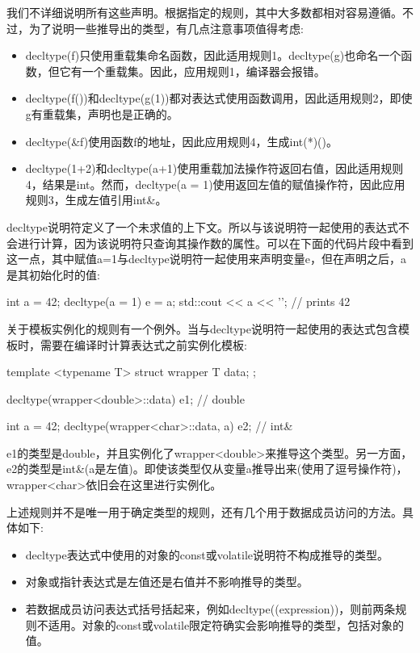 我们不详细说明所有这些声明。根据指定的规则，其中大多数都相对容易遵循。不过，为了说明一些推导出的类型，有几点注意事项值得考虑:

\begin{itemize}
\item
decltype(f)只使用重载集命名函数，因此适用规则1。decltype(g)也命名一个函数，但它有一个重载集。因此，应用规则1，编译器会报错。

\item
decltype(f())和decltype(g(1))都对表达式使用函数调用，因此适用规则2，即使g有重载集，声明也是正确的。

\item
decltype(\&f)使用函数f的地址，因此应用规则4，生成int(*)()。

\item
decltype(1+2)和decltype(a+1)使用重载加法操作符返回右值，因此适用规则4，结果是int。然而，decltype(a = 1)使用返回左值的赋值操作符，因此应用规则3，生成左值引用int\&。
\end{itemize}

decltype说明符定义了一个未求值的上下文。所以与该说明符一起使用的表达式不会进行计算，因为该说明符只查询其操作数的属性。可以在下面的代码片段中看到这一点，其中赋值a=1与decltype说明符一起使用来声明变量e，但在声明之后，a是其初始化时的值:

\begin{cpp}
int a = 42;
decltype(a = 1) e = a;
std::cout << a << '\n'; // prints 42
\end{cpp}

关于模板实例化的规则有一个例外。当与decltype说明符一起使用的表达式包含模板时，需要在编译时计算表达式之前实例化模板:

\begin{cpp}
template <typename T>
struct wrapper
{
	T data;
};

decltype(wrapper<double>::data) e1; // double

int a = 42;
decltype(wrapper<char>::data, a) e2; // int&
\end{cpp}

e1的类型是double，并且实例化了wrapper<double>来推导这个类型。另一方面，e2的类型是int\&(a是左值)。即使该类型仅从变量a推导出来(使用了逗号操作符)，wrapper<char>依旧会在这里进行实例化。

上述规则并不是唯一用于确定类型的规则，还有几个用于数据成员访问的方法。具体如下:

\begin{itemize}
\item
decltype表达式中使用的对象的const或volatile说明符不构成推导的类型。

\item
对象或指针表达式是左值还是右值并不影响推导的类型。

\item
若数据成员访问表达式括号括起来，例如decltype((expression))，则前两条规则不适用。对象的const或volatile限定符确实会影响推导的类型，包括对象的值。
\end{itemize}

